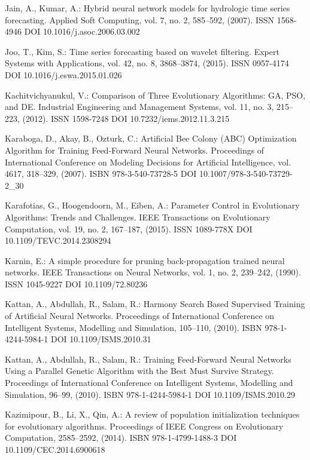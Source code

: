 \begin{thebibliography}{99.}
 Jain, A., Kumar, A.: Hybrid neural network models for hydrologic time series forecasting. Applied Soft Computing, vol. 7, no. 2, 585--592, (2007). ISSN 1568-4946 DOI 10.1016/j.asoc.2006.03.002

 Joo, T., Kim, S.: Time series forecasting based on wavelet filtering. Expert Systems with Applications, vol. 42, no. 8, 3868--3874, (2015). ISSN 0957-4174 DOI 10.1016/j.eswa.2015.01.026

 Kachitvichyanukul, V.: Comparison of Three Evolutionary Algorithms: GA, PSO, and DE. Industrial Engineering and Management Systems, vol. 11, no. 3, 215--223, (2012). ISSN 1598-7248 DOI 10.7232/iems.2012.11.3.215

 Karaboga, D., Akay, B., Ozturk, C.: Artificial Bee Colony (ABC) Optimization Algorithm for Training Feed-Forward Neural Networks. Proceedings of International Conference on Modeling Decisions for Artificial Intelligence, vol. 4617, 318--329, (2007). ISBN 978-3-540-73728-5 DOI 10.1007/978-3-540-73729-2\_30

 Karafotias, G., Hoogendoorn, M., Eiben, A.: Parameter Control in Evolutionary Algorithms: Trends and Challenges. IEEE Transactions on Evolutionary Computation, vol. 19, no. 2, 167--187, (2015). ISSN 1089-778X DOI 10.1109/TEVC.2014.2308294

 Karnin, E.: A simple procedure for pruning back-propagation trained neural networks. IEEE Transactions on Neural Networks, vol. 1, no. 2, 239--242, (1990). ISSN 1045-9227 DOI 10.1109/72.80236

 Kattan, A., Abdullah, R., Salam, R.: Harmony Search Based Supervised Training of Artificial Neural Networks. Proceedings of International Conference on Intelligent Systems, Modelling and Simulation, 105--110, (2010). ISBN 978-1-4244-5984-1 DOI 10.1109/ISMS.2010.31

 Kattan, A., Abdullah, R., Salam, R.: Training Feed-Forward Neural Networks Using a Parallel Genetic Algorithm with the Best Must Survive Strategy. Proceedings of International Conference on Intelligent Systems, Modelling and Simulation, 96--99, (2010). ISBN 978-1-4244-5984-1 DOI 10.1109/ISMS.2010.29

 Kazimipour, B., Li, X., Qin, A.: A review of population initialization techniques for evolutionary algorithms. Proceedings of IEEE Congress on Evolutionary Computation, 2585--2592, (2014). ISBN 978-1-4799-1488-3 DOI 10.1109/CEC.2014.6900618


\end{thebibliography}
